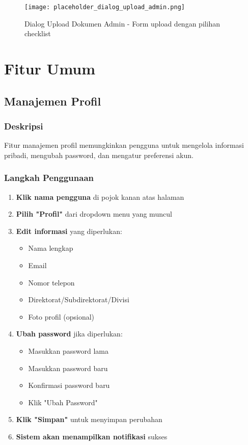 \documentclass[12pt,a4paper]{article}
\begin{document}
\begin{figure}[H]
\centering
\texttt{[image: placeholder\_dialog\_upload\_admin.png]}
\caption{Dialog Upload Dokumen Admin - Form upload dengan pilihan checklist}
\label{fig:dialog_upload_admin}
\end{figure}

\section{Fitur Umum}

\subsection{Manajemen Profil}

\subsubsection{Deskripsi}
Fitur manajemen profil memungkinkan pengguna untuk mengelola informasi pribadi, mengubah password, dan mengatur preferensi akun.

\subsubsection{Langkah Penggunaan}
\begin{enumerate}
\item \textbf{Klik nama pengguna} di pojok kanan atas halaman
\item \textbf{Pilih "Profil"} dari dropdown menu yang muncul
\item \textbf{Edit informasi} yang diperlukan:
\begin{itemize}
\item Nama lengkap
\item Email
\item Nomor telepon
\item Direktorat/Subdirektorat/Divisi
\item Foto profil (opsional)
\end{itemize}
\item \textbf{Ubah password} jika diperlukan:
\begin{itemize}
\item Masukkan password lama
\item Masukkan password baru
\item Konfirmasi password baru
\item Klik "Ubah Password"
\end{itemize}
\item \textbf{Klik "Simpan"} untuk menyimpan perubahan
\item \textbf{Sistem akan menampilkan notifikasi} sukses
\end{enumerate}
\end{document}
